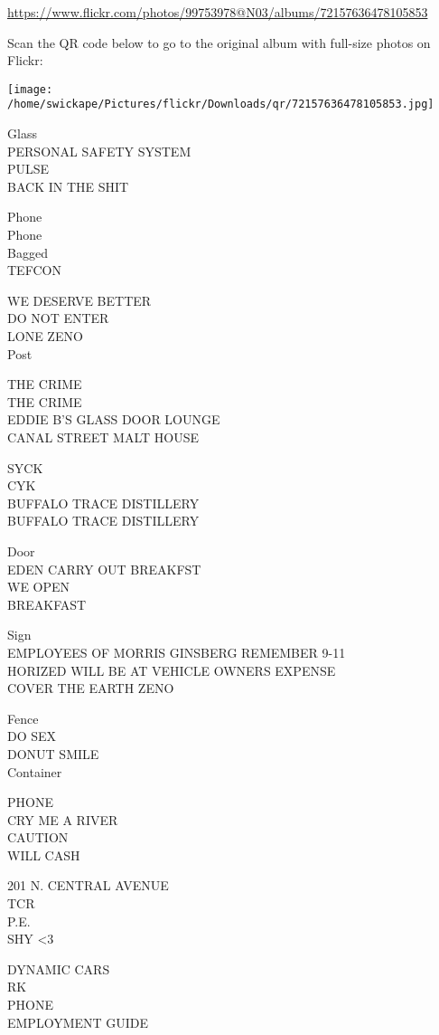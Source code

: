 \documentclass[10pt,letterpaper]{article}
\begin{document}
\url{https://www.flickr.com/photos/99753978@N03/albums/72157636478105853}

Scan the QR code below to go to the original album with full-size photos on Flickr:

\texttt{[image: /home/swickape/Pictures/flickr/Downloads/qr/72157636478105853.jpg]}


Glass\\
PERSONAL SAFETY SYSTEM\\
PULSE\\
BACK IN THE SHIT

Phone\\
Phone\\
Bagged\\
TEFCON

WE DESERVE BETTER\\
DO NOT ENTER\\
LONE ZENO\\
Post

THE CRIME\\
THE CRIME\\
EDDIE B'S GLASS DOOR LOUNGE\\
CANAL STREET MALT HOUSE

SYCK\\
CYK\\
BUFFALO TRACE DISTILLERY\\
BUFFALO TRACE DISTILLERY

Door\\
EDEN CARRY OUT BREAKFST\\
WE OPEN\\
BREAKFAST

Sign\\
EMPLOYEES OF MORRIS GINSBERG REMEMBER 9{-}11\\
HORIZED WILL BE AT VEHICLE OWNERS EXPENSE\\
COVER THE EARTH ZENO

Fence\\
DO SEX\\
DONUT SMILE\\
Container

PHONE\\
CRY ME A RIVER\\
CAUTION\\
WILL CASH

201 N. CENTRAL AVENUE\\
TCR\\
P.E.\\
SHY <3

DYNAMIC CARS\\
RK\\
PHONE\\
EMPLOYMENT GUIDE
\end{document}
